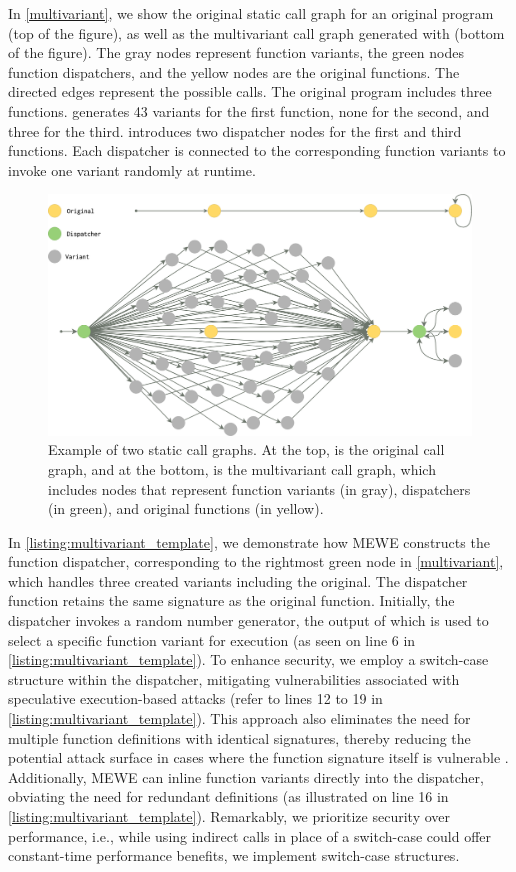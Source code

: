  


In \autoref{multivariant}, we show the original static call graph for an original program (top of the figure), as well as the multivariant call graph generated with \tool (bottom of the figure).
The gray nodes represent function variants, the green nodes function dispatchers, and the yellow nodes are the original functions.
The directed edges represent the possible calls.
The original program includes three functions. \tool generates 43 variants for the first function, none for the second, and three for the third. 
\tool introduces two dispatcher nodes for the first and third functions. Each dispatcher is connected to the corresponding function variants to invoke one variant randomly at runtime.


\begin{figure}[h]
  \centering
\includegraphics[width=.75\linewidth]{diagrams/CFG.png}
\caption{Example of two static call graphs. At the top, is the original call graph, and at the bottom, is the multivariant call graph, which includes nodes that represent function variants (in gray), dispatchers (in green), and original functions  (in yellow).
}
\label{multivariant}
\end{figure}

In \autoref{listing:multivariant_template}, we demonstrate how MEWE constructs the function dispatcher, corresponding to the rightmost green node in \autoref{multivariant}, which handles three created variants including the original. 
The dispatcher function retains the same signature as the original function. Initially, the dispatcher invokes a random number generator, the output of which is used to select a specific function variant for execution (as seen on line 6 in \autoref{listing:multivariant_template}). 
To enhance security, we employ a switch-case structure within the dispatcher, mitigating vulnerabilities associated with speculative execution-based attacks \cite{Narayan2021Swivel} (refer to lines 12 to 19 in \autoref{listing:multivariant_template}). 
This approach also eliminates the need for multiple function definitions with identical signatures, thereby reducing the potential attack surface in cases where the function signature itself is vulnerable \cite{veriwasm}.
Additionally, MEWE can inline function variants directly into the dispatcher, obviating the need for redundant definitions (as illustrated on line 16 in \autoref{listing:multivariant_template}). 
Remarkably, we prioritize security over performance, i.e., while using indirect calls in place of a switch-case could offer constant-time performance benefits, we implement switch-case structures.


